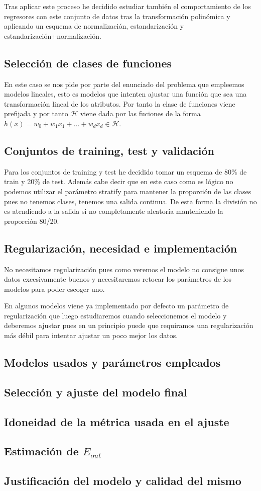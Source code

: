 \documentclass[12pt,a4paper]{article}
\begin{document}
Tras aplicar este proceso he decidido estudiar también el comportamiento de los regresores con este conjunto de datos tras la transformación polinómica y aplicando un esquema de normalización, estandarización y estandarización+normalización.

\subsection{Selección de clases de funciones}

En este caso se nos pide por parte del enunciado del problema que empleemos modelos lineales, esto es modelos que intenten ajustar una función que sea una transformación lineal de los atributos. Por tanto la clase de funciones viene prefijada y por tanto $\mathcal{H}$ viene dada por las fuciones de la forma $h(x) = w_0 + w_1 x_1 + ... + w_d x_d \in \mathcal{H}$.

\subsection{Conjuntos de training, test y validación}

Para los conjuntos de training y test he decidido tomar un esquema de 80\% de train y 20\% de test. Además cabe decir que en este caso como es lógico no podemos utilizar el parámetro stratify para mantener la proporción de las clases pues no tenemos clases, tenemos una salida continua. De esta forma la división no es atendiendo a la salida si no completamente aleatoria manteniendo la proporción 80/20.

\subsection{Regularización, necesidad e implementación}

No necesitamos regularización pues como veremos el modelo no consigue unos datos excesivamente buenos y necesitaremos retocar los parámetros de los modelos para poder escoger uno.

En algunos modelos viene ya implementado por defecto un parámetro de regularización que luego estudiaremos cuando seleccionemos el modelo y deberemos ajustar pues en un principio puede que requiramos una regularización más débil para intentar ajustar un poco mejor los datos.

\subsection{Modelos usados y parámetros empleados}

\subsection{Selección y ajuste del modelo final}

\subsection{Idoneidad de la métrica usada en el ajuste}

\subsection{Estimación de $E_{out}$}

\subsection{Justificación del modelo y calidad del mismo}
\end{document}
